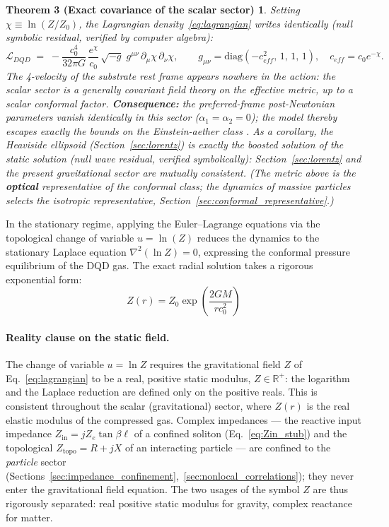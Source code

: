 \documentclass[11pt,a4paper]{article}
\theoremstyle{plain}
\newtheorem*{thmC}{Theorem 3 (Exact covariance of the scalar sector)}
\theoremstyle{remark}
\begin{document}
\begin{thmC}
Setting $\chi \equiv \ln(Z/Z_0)$, the Lagrangian density~\eqref{eq:lagrangian} writes \emph{identically} (null symbolic residual, verified by computer algebra):
\begin{equation}
\mathcal{L}_{DQD} \;=\; -\frac{c_0^4}{32\pi G}\,\frac{e^{\chi}}{c_0}\,\sqrt{-g}\;g^{\mu\nu}\,\partial_\mu \chi\,\partial_\nu \chi ,
\qquad g_{\mu\nu} = \mathrm{diag}\!\left(-c_{eff}^2,\,1,\,1,\,1\right),\quad c_{eff} = c_0 e^{-\chi}.
\end{equation}
The 4-velocity of the substrate rest frame appears nowhere in the action: the scalar sector is a generally covariant field theory on the effective metric, up to a scalar conformal factor. \textbf{Consequence:} the preferred-frame post-Newtonian parameters vanish identically in this sector ($\alpha_1 = \alpha_2 = 0$); the model thereby escapes exactly the bounds on the Einstein-aether class \cite{jacobson_ae, will_ppn}. As a corollary, the Heaviside ellipsoid (Section~\ref{sec:lorentz}) is exactly the boosted solution of the static solution (null wave residual, verified symbolically): Section~\ref{sec:lorentz} and the present gravitational sector are mutually consistent. \emph{(The metric above is the \textbf{optical} representative of the conformal class; the dynamics of massive particles selects the isotropic representative, Section~\ref{sec:conformal_representative}.)}
\end{thmC}

In the stationary regime, applying the Euler--Lagrange equations via the topological change of variable $u = \ln(Z)$ reduces the dynamics to the stationary Laplace equation $\nabla^2(\ln Z) = 0$, expressing the conformal pressure equilibrium of the DQD gas. The exact radial solution takes a rigorous exponential form:
\begin{equation}
Z(r) = Z_0 \exp\left( \frac{2GM}{r c_0^2} \right)
\end{equation}

\paragraph{Reality clause on the static field.} The change of variable $u = \ln Z$ requires the gravitational field $Z$ of Eq.~\eqref{eq:lagrangian} to be a real, positive static modulus, $Z \in \mathbb{R}^+$: the logarithm and the Laplace reduction are defined only on the positive reals. This is consistent throughout the scalar (gravitational) sector, where $Z(r)$ is the real elastic modulus of the compressed gas. Complex impedances --- the reactive input impedance $Z_{\text{in}} = jZ_e\tan\beta\ell$ of a confined soliton (Eq.~\ref{eq:Zin_stub}) and the topological $Z_{\text{topo}} = R + jX$ of an interacting particle --- are confined to the \emph{particle} sector (Sections~\ref{sec:impedance_confinement},~\ref{sec:nonlocal_correlations}); they never enter the gravitational field equation. The two usages of the symbol $Z$ are thus rigorously separated: real positive static modulus for gravity, complex reactance for matter.
\end{document}
